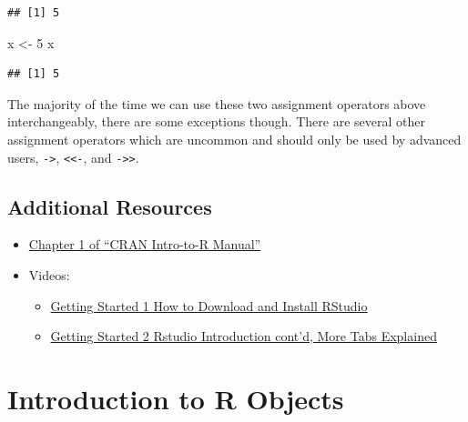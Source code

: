 \documentclass[
]{book}
\newenvironment{Shaded}{\begin{snugshade}}{\end{snugshade}}
\newcommand{\DecValTok}[1]{\textcolor[rgb]{0.00,0.00,0.81}{#1}}
\newcommand{\NormalTok}[1]{#1}
\newcommand{\StringTok}[1]{\textcolor[rgb]{0.31,0.60,0.02}{#1}}
\providecommand{\tightlist}{%
  \setlength{\itemsep}{0pt}\setlength{\parskip}{0pt}}
\begin{document}
\begin{verbatim}
## [1] 5
\end{verbatim}

\begin{Shaded}
\begin{Highlighting}[]
\NormalTok{x <-}\StringTok{ }\DecValTok{5}
\NormalTok{x}
\end{Highlighting}
\end{Shaded}

\begin{verbatim}
## [1] 5
\end{verbatim}

The majority of the time we can use these two assignment operators above interchangeably, there are some exceptions though. There are several other assignment operators which are uncommon and should only be used by advanced users, \texttt{-\textgreater{}}, \texttt{\textless{}\textless{}-}, and \texttt{-\textgreater{}\textgreater{}}.

\hypertarget{additional-resources}{%
\section{Additional Resources}\label{additional-resources}}

\begin{itemize}
\tightlist
\item
  \href{https://cran.r-project.org/doc/manuals/r-release/R-intro.pdf}{Chapter 1 of ``CRAN Intro-to-R Manual''}
\item
  Videos:

  \begin{itemize}
  \tightlist
  \item
    \href{https://ucr.yuja.com/V/Video?v=2365045\&node=8476457\&a=437885577\&autoplay=1}{Getting Started 1 \textbar{} How to Download and Install RStudio}
  \item
    \href{https://ucr.yuja.com/V/Video?v=2368643\&node=8487538\&a=437248619\&autoplay=1}{Getting Started 2 \textbar{} Rstudio Introduction cont'd, More Tabs Explained}
  \end{itemize}
\end{itemize}

\hypertarget{introduction-to-r-objects}{%
\chapter{Introduction to R Objects}\label{introduction-to-r-objects}}
\end{document}
